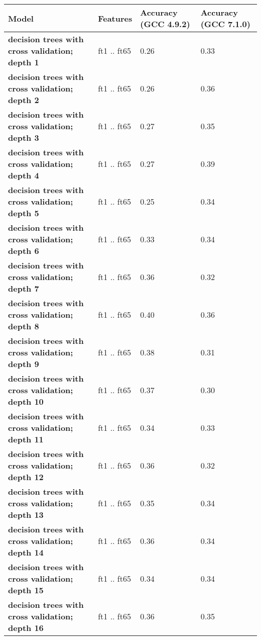     \begin{tabular}{|l|p{1.2in}|p{0.9in}|p{0.9in}|}
     \hline
      \textbf{Model} & \textbf{Features} & \textbf{Accuracy (GCC 4.9.2)} & \textbf{Accuracy (GCC 7.1.0)} \\ 
     \hline
      \textbf{ decision trees with cross validation; depth 1 } &  ft1 .. ft65  &  0.26  &  0.33 \\
     \hline
      \textbf{ decision trees with cross validation; depth 2 } &  ft1 .. ft65  &  0.26  &  0.36 \\
     \hline
      \textbf{ decision trees with cross validation; depth 3 } &  ft1 .. ft65  &  0.27  &  0.35 \\
     \hline
      \textbf{ decision trees with cross validation; depth 4 } &  ft1 .. ft65  &  0.27  &  0.39 \\
     \hline
      \textbf{ decision trees with cross validation; depth 5 } &  ft1 .. ft65  &  0.25  &  0.34 \\
     \hline
      \textbf{ decision trees with cross validation; depth 6 } &  ft1 .. ft65  &  0.33  &  0.34 \\
     \hline
      \textbf{ decision trees with cross validation; depth 7 } &  ft1 .. ft65  &  0.36  &  0.32 \\
     \hline
      \textbf{ decision trees with cross validation; depth 8 } &  ft1 .. ft65  &  0.40  &  0.36 \\
     \hline
      \textbf{ decision trees with cross validation; depth 9 } &  ft1 .. ft65  &  0.38  &  0.31 \\
     \hline
      \textbf{ decision trees with cross validation; depth 10 } &  ft1 .. ft65  &  0.37  &  0.30 \\
     \hline
      \textbf{ decision trees with cross validation; depth 11 } &  ft1 .. ft65  &  0.34  &  0.33 \\
     \hline
      \textbf{ decision trees with cross validation; depth 12 } &  ft1 .. ft65  &  0.36  &  0.32 \\
     \hline
      \textbf{ decision trees with cross validation; depth 13 } &  ft1 .. ft65  &  0.35  &  0.34 \\
     \hline
      \textbf{ decision trees with cross validation; depth 14 } &  ft1 .. ft65  &  0.36  &  0.34 \\
     \hline
      \textbf{ decision trees with cross validation; depth 15 } &  ft1 .. ft65  &  0.34  &  0.34 \\
     \hline
      \textbf{ decision trees with cross validation; depth 16 } &  ft1 .. ft65  &  0.36  &  0.35 \\

\end{tabular}
